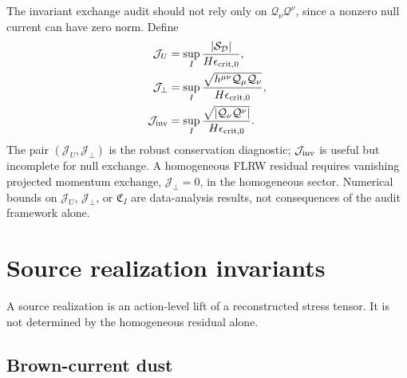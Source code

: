 \documentclass[
  aps,
  prd,
  reprint,
  superscriptaddress,
  floatfix,
  nofootinbib,
  longbibliography
]{revtex4-2}
\theoremstyle{plain}
\theoremstyle{definition}
\theoremstyle{remark}
\newcommand{\D}{\mathcal D}
\newcommand{\crit}{\mathrm{crit}}
\newcommand{\Qcal}{\mathcal Q}
\newcommand{\Jcal}{\mathcal J}
\newcommand{\Scal}{\mathcal S}
\begin{document}
The invariant exchange audit should not rely only on $\Qcal_\nu\Qcal^\nu$, since a nonzero null current can have zero norm.  Define
\begin{align}
\Jcal_U&=\sup_I \frac{|\Scal_\D|}{H\epsilon_{\crit,0}},
\label{eq:J_U}\\
\Jcal_\perp&=\sup_I \frac{\sqrt{h^{\mu\nu}\Qcal_\mu\Qcal_\nu}}{H\epsilon_{\crit,0}},
\label{eq:J_perp}\\
\Jcal_{\rm inv}&=\sup_I \frac{\sqrt{|\Qcal_\nu\Qcal^\nu|}}{H\epsilon_{\crit,0}}.
\label{eq:J_inv}
\end{align}
The pair $(\Jcal_U,\Jcal_\perp)$ is the robust conservation diagnostic; $\Jcal_{\rm inv}$ is useful but incomplete for null exchange.  A homogeneous FLRW residual requires vanishing projected momentum exchange, $\Jcal_\perp=0$, in the homogeneous sector.  Numerical bounds on $\Jcal_U$, $\Jcal_\perp$, or $\mathfrak C_I$ are data-analysis results, not consequences of the audit framework alone.

\section{Source realization invariants}

A source realization is an action-level lift of a reconstructed stress tensor.  It is not determined by the homogeneous residual alone.

\subsection{Brown-current dust}
\end{document}

